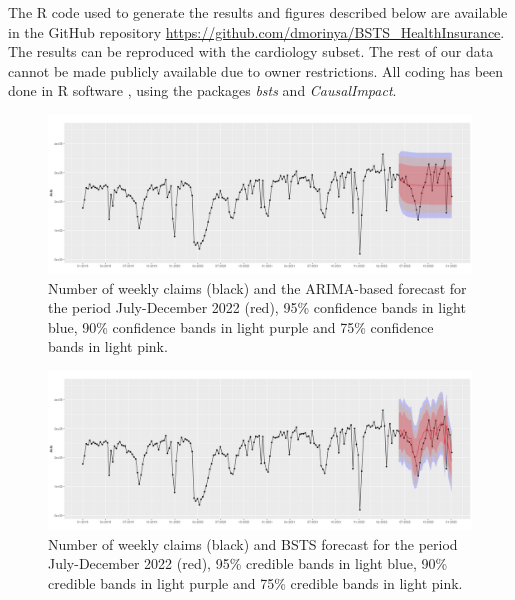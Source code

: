 \documentclass[]{risa}
\begin{document}
The R code used to generate the results and figures described below are available in the GitHub repository \url{https://github.com/dmorinya/BSTS_HealthInsurance}. The results can be reproduced with the cardiology subset. The rest of our data cannot be made publicly available due to owner restrictions. All coding has been done in R software \cite{r_core_team_r_2019}, using the packages \textit{bsts} \cite{scott_predicting_nodate} and \textit{CausalImpact}\cite{brodersen_inferring_2015}. 
	
\begin{center}
  \begin{figure}[h]
	\begin{minipage}{160mm}
    \includegraphics[width=16cm]{arima_global_prediction.png}\caption{Number of weekly claims (black) and the ARIMA-based forecast for the period July-December 2022 (red), 95\% confidence bands in light blue, 90\% confidence bands in light purple and 75\% confidence bands in light pink.}\label{fig2}
	 \end{minipage}
  \end{figure}
	\end{center}

\begin{center}
  \begin{figure}[h]
	\begin{minipage}{160mm}
    \includegraphics[width=16cm]{bsts_global_prediction.png}\caption{Number of weekly claims (black) and BSTS forecast for the period July-December 2022 (red), 95\% credible bands in light blue, 90\% credible bands in light purple and 75\% credible bands in light pink.}\label{fig3}
  \end{minipage}
  \end{figure}
\end{center}
\end{document}
